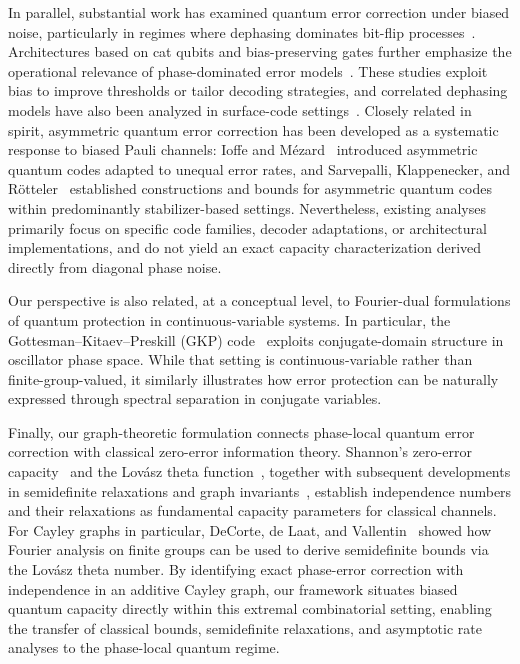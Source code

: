 \documentclass[a4paper,twocolumn,11pt,allowtoday]{quantumarticle}
\theoremstyle{plain}
\theoremstyle{definition}
\theoremstyle{remark}
\begin{document}
In parallel, substantial work has examined quantum error correction under biased noise, particularly in regimes where dephasing dominates bit-flip processes~\cite{AliferisPreskill2008,Tuckett2018,Tuckett2019,BonillaAtaides2021}. Architectures based on cat qubits and bias-preserving gates further emphasize the operational relevance of phase-dominated error models~\cite{GuillaudMirrahimi2019,Berdou2023,Puri2020,EtxezarretaMartinez2024}. These studies exploit bias to improve thresholds or tailor decoding strategies, and correlated dephasing models have also been analyzed in surface-code settings~\cite{NickersonBrown2019,Layden2020}. Closely related in spirit, asymmetric quantum error correction has been developed as a systematic response to biased Pauli channels: Ioffe and M{\'e}zard~\cite{IoffeMezard2007} introduced asymmetric quantum codes adapted to unequal error rates, and Sarvepalli, Klappenecker, and R\"otteler~\cite{Sarvepalli2009} established constructions and bounds for asymmetric quantum codes within predominantly stabilizer-based settings. Nevertheless, existing analyses primarily focus on specific code families, decoder adaptations, or architectural implementations, and do not yield an exact capacity characterization derived directly from diagonal phase noise.

Our perspective is also related, at a conceptual level, to Fourier-dual formulations of quantum protection in continuous-variable systems. In particular, the Gottesman--Kitaev--Preskill (GKP) code~\cite{GKP2001} exploits conjugate-domain structure in oscillator phase space. While that setting is continuous-variable rather than finite-group-valued, it similarly illustrates how error protection can be naturally expressed through spectral separation in conjugate variables.

Finally, our graph-theoretic formulation connects phase-local quantum error correction with classical zero-error information theory. Shannon’s zero-error capacity~\cite{Shannon1956} and the Lovász theta function~\cite{Lovasz1979}, together with subsequent developments in semidefinite relaxations and graph invariants~\cite{Sason2023,Sason2024}, establish independence numbers and their relaxations as fundamental capacity parameters for classical channels. For Cayley graphs in particular, DeCorte, de Laat, and Vallentin~\cite{DeCorte2014} showed how Fourier analysis on finite groups can be used to derive semidefinite bounds via the Lovász theta number. By identifying exact phase-error correction with independence in an additive Cayley graph, our framework situates biased quantum capacity directly within this extremal combinatorial setting, enabling the transfer of classical bounds, semidefinite relaxations, and asymptotic rate analyses to the phase-local quantum regime.
\end{document}
